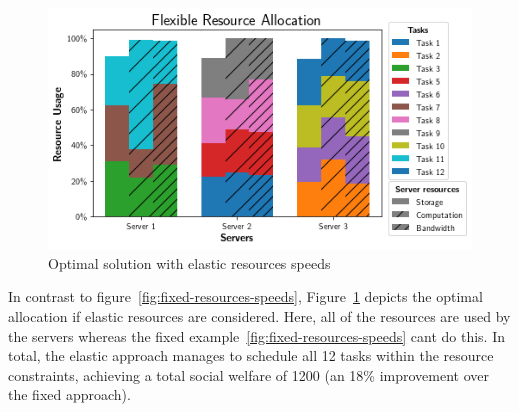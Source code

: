\begin{figure}[th]
    \centering
    \includegraphics[width=\linewidth]{figs/allocation/flexible_resource_allocation.png}
    \caption{Optimal solution with elastic resources speeds}
    \label{fig:flexible-resources-speeds}
\end{figure}

In contrast to figure~\ref{fig:fixed-resources-speeds}, Figure~\ref{fig:flexible-resources-speeds} depicts the optimal
allocation if elastic resources are considered. Here, all of the resources are used by the servers whereas the fixed
example~\ref{fig:fixed-resources-speeds} cant do this. In total, the elastic approach manages to schedule all 12 tasks
within the resource constraints, achieving a total social welfare of 1200 (an 18\% improvement over the fixed approach).
